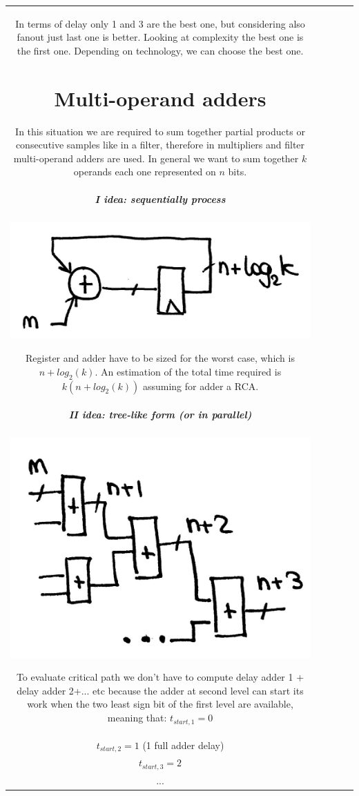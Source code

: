 \begin{center}
\begin{tabular}{|c|c|c|c|c|}
In terms of delay only 1 and 3 are the best one, but considering also fanout just last one is better. Looking at complexity the best one is the first one. Depending on technology, we can choose the best one.

\section{Multi-operand adders}

In this situation we are required to sum together partial products or consecutive samples like in a filter, therefore in multipliers and filter multi-operand adders are used. In general we want to sum together $k$ operands each one represented on $n$ bits.

\subparagraph{I idea: sequentially process}
\begin{center}
  \includegraphics[width=0.5\linewidth]{img/img2/24}
\end{center}

Register and adder have to be sized for the worst case, which is $n+log_2(k)$. An estimation of the total time required is $k(n+log_2(k))$ assuming for adder a RCA.

\subparagraph{II idea: tree-like form  (or in parallel)}
\begin{center}
  \includegraphics[width=0.5\linewidth]{img/img2/25}
\end{center}

To evaluate critical path we don't have to compute delay adder 1 + delay adder 2+... etc because the adder at second level can start its work when the two least sign bit of the first level are available, meaning that:
$t_{start,1}=0$\\
$t_{start,2}=1$ (1 full adder delay)\\
$t_{start,3}=2$\\
$...$\\


\end{tabular}
\end{center}
